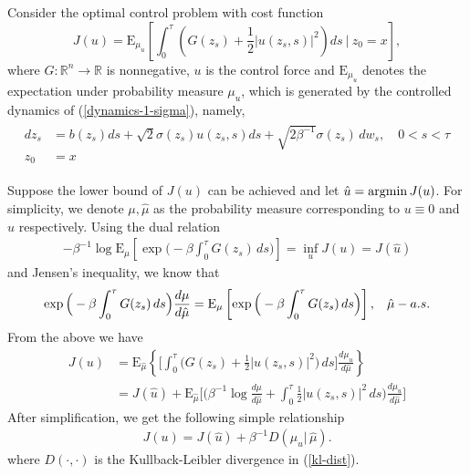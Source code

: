 \documentclass[final]{siamltex}
\newcommand{\argmin}{\mathop{\rm argmin}}%
\begin{document}
Consider the optimal control problem with cost
function \cite{control_schuette,zlph2013}
\begin{equation}
  J(u) = \mathrm{E}_{\mu_u}\left[\int_0^\tau \left(G(z_s) + \frac{1}{2} |u(z_s,s)|^2
\right) ds ~\bigg|~ z_0 = x\right],
\end{equation}
where $G : \mathbb{R}^n\rightarrow \mathbb{R}$ is nonnegative, $u$ is the
control force and $\mathrm{E}_{\mu_u}$ denotes the expectation under probability measure $\mu_u$,
which is generated by the controlled dynamics
of (\ref{dynamics-1-sigma}), namely,
\begin{align}
 \begin{split}
   d z_s &= b(z_s) ds + \sqrt{2}\sigma(z_s) u(z_s, s) ds + \sqrt{2\beta^{-1}} \sigma(z_s)\,dw_s, \quad 0 < s < \tau \\
    z_0&=x
  \end{split}
  \label{dynamics-1-sigmma-c}
\end{align}

Suppose the lower bound of $J(u)$ can be achieved and let $\hat{u} = \argmin J(u)$. For simplicity, we denote $\mu, \hat{\mu}$ as
the probability measure corresponding to $u \equiv 0$ and $\hat{u}$
respectively. Using the dual relation \cite{DaiPra1996, zlph2013}
    \begin{align}
      -\beta^{-1}\log \mathrm{E}_\mu\left[\exp\Big(-\beta\int_0^\tau G(z_s)\, ds\Big)\right] = \inf_u J(u) = J(\hat{u})
      \label{dual-relation}
    \end{align}
    and Jensen's inequality, we know that 
    \begin{align}
    \exp\Big(-\beta\int_0^\tau G(z_s)\,ds\Big)\frac{d\mu}{d\hat{\mu}} =
    \mathrm{E}_\mu\left[\exp\Big(-\beta\int_0^\tau G(z_s)\, ds\Big)\right],
    \hspace{3mm} \hat{\mu}-a.s.
    \label{jensen-as}
  \end{align}
From the above we have 
  \begin{align}
    J(u) &= \mathrm{E}_{\hat{\mu}} \left\{\Big[\int_0^\tau \Big(G(z_s) + \frac{1}{2} |u(z_s,
    s)|^2\Big)\,ds\Big]\frac{d\mu_u}{d\hat{\mu}}\right\}  \\
    & = J(\hat{u}) + \mathrm{E}_{\hat{\mu}}\Big[\Big(\beta^{-1}\log
    \frac{d\mu}{d\hat{\mu}} + \int_0^\tau \frac{1}{2} |u(z_s,
    s)|^2\,ds\Big)\frac{d\mu_u}{d\hat{\mu}}\Big]
\end{align}
After simplification, we get the following simple relationship 
\begin{align}
J(u) = J(\hat{u}) + \beta^{-1}D(\mu_u|\, \hat{\mu}).
\label{J-entropy}
\end{align}
where $D(\cdot, \cdot)$ is the Kullback-Leibler divergence in (\ref{kl-dist}).
\end{document}
